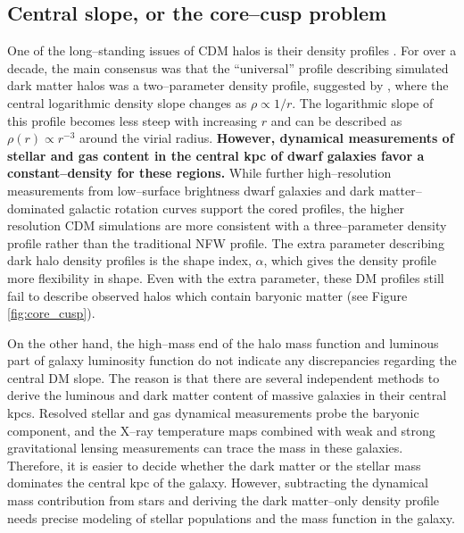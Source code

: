 \documentclass[a4wide,12pt]{book}
\newcommand{\ignore}[1]{}
\begin{document}
\subsection{Central slope, or the core--cusp problem}
\label{subsec:core-cusp}
One of the long--standing issues of CDM halos is their density profiles \citep[][]{Dubinski.Carlberg1991, Walker.Penarrubia2011}. For over a decade, the main consensus was that the ``universal'' profile describing simulated dark matter halos was a two--parameter density profile, suggested by \citet[][ hereafter NFW]{NFW96}, where the central logarithmic density slope changes as $\rho \propto 1/r$. The logarithmic slope of this profile becomes less steep with increasing $r$ and can be described as $\rho(r) \propto r^{-3}$ around the virial radius. {\bf However, dynamical measurements of stellar and gas content in the central kpc of dwarf galaxies \citep[][]{Oh+2011} favor a constant--density for these regions.} While further high--resolution measurements from low--surface brightness dwarf galaxies and dark matter--dominated galactic rotation curves support the cored profiles, the higher resolution CDM simulations are more consistent with a three--parameter density profile rather than the traditional NFW profile. The extra parameter describing dark halo density profiles is the shape index, $\alpha$, which gives the density profile more flexibility in shape. Even with the extra parameter, these DM profiles still fail to describe observed halos which contain baryonic matter (see Figure \ref{fig:core_cusp}).

On the other hand, the high--mass end of the halo mass function and luminous part of galaxy luminosity function do not indicate any discrepancies regarding the central DM slope. The reason is that there are several independent methods to derive the luminous and dark matter content of massive galaxies in their central kpcs. Resolved stellar and gas dynamical measurements probe the baryonic component\ignore{ \citep[][]{}}, and the X--ray temperature maps combined with weak and strong gravitational lensing measurements can trace the mass in these galaxies\ignore{ \citep[][]{}}. Therefore, it is easier to decide whether the dark matter or the stellar mass dominates the central kpc of the galaxy. 
 However, subtracting the dynamical mass contribution from stars and deriving the dark matter--only density profile needs precise modeling of stellar populations and the mass function in the galaxy. 
\end{document}
